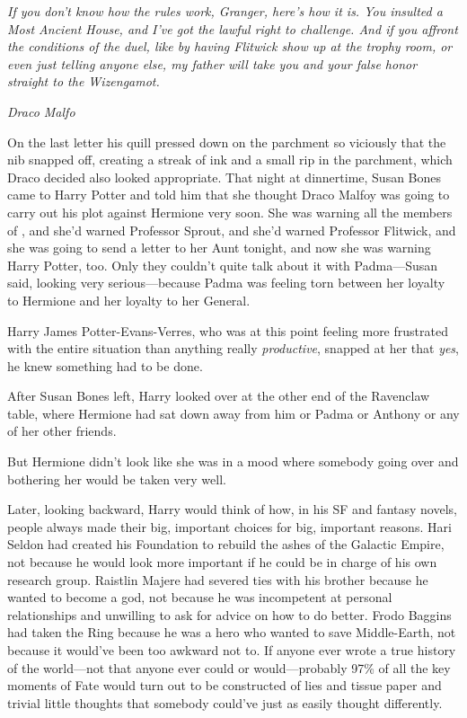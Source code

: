 \emph{If you don't know how the rules work, Granger, here's how it is. You 
insulted a Most Ancient House, and I've got the lawful right to challenge. And 
if you affront the conditions of the duel, like by having Flitwick show up at 
the trophy room, or even just telling anyone else, my father will take you and 
your false honor straight to the Wizengamot.}

\emph{Draco Malfo}

On the last letter his quill pressed down on the parchment so viciously that 
the nib snapped off, creating a streak of ink and a small rip in the parchment, 
which Draco decided also looked appropriate.
\sbreak
That night at dinnertime, Susan Bones came to Harry Potter and told him that 
she thought Draco Malfoy was going to carry out his plot against Hermione very 
soon. She was warning all the members of \SPHEW, and she'd warned Professor 
Sprout, and she'd warned Professor Flitwick, and she was going to send a letter 
to her Aunt tonight, and now she was warning Harry Potter, too. Only they 
couldn't quite talk about it with Padma---Susan said, looking very 
serious---because Padma was feeling torn between her loyalty to Hermione and 
her loyalty to her General.

Harry James Potter-Evans-Verres, who was at this point feeling more frustrated 
with the entire situation than anything really \emph{productive}, snapped at 
her that \emph{yes}, he knew something had to be done.

After Susan Bones left, Harry looked over at the other end of the Ravenclaw 
table, where Hermione had sat down away from him or Padma or Anthony or any of 
her other friends.

But Hermione didn't look like she was in a mood where somebody going over and 
bothering her would be taken very well.

Later, looking backward, Harry would think of how, in his SF and fantasy 
novels, people always made their big, important choices for big, important 
reasons. Hari Seldon had created his Foundation to rebuild the ashes of the 
Galactic Empire, not because he would look more important if he could be in 
charge of his own research group. Raistlin Majere had severed ties with his 
brother because he wanted to become a god, not because he was incompetent at 
personal relationships and unwilling to ask for advice on how to do better. 
Frodo Baggins had taken the Ring because he was a hero who wanted to save 
Middle-Earth, not because it would've been too awkward not to. If anyone ever 
wrote a true history of the world---not that anyone ever could or 
would---probably 97\% of all the key moments of Fate would turn out to be 
constructed of lies and tissue paper and trivial little thoughts that somebody 
could've just as easily thought differently.

